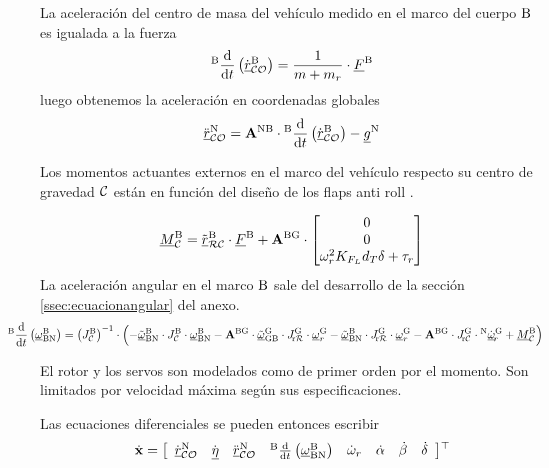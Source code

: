 La aceleración del centro de masa del vehículo medido en el marco del cuerpo $\mathrm{B}$ es igualada a la fuerza
\begin{equation}
	{}^{\mathrm{B}}\frac{\textrm{d} }{\textrm{d} t}\left( \dot{{ \underline{r} }}_{\mathcal{CO}}^{\mathrm{B}} \right) = \frac{1}{m+m_r} \cdot { \underline{F} }^{\mathrm{B}}
\end{equation}
luego obtenemos la aceleración en coordenadas globales
\begin{equation}
	\ddot{{ \underline{r} }}_{\mathcal{CO}}^{\mathrm{N}} =
	\mathbf{A}^{\mathrm{NB}}\cdot {}^{\mathrm{B}}\frac{\textrm{d} }{\textrm{d} t}\left( \dot{{ \underline{r} }}_{\mathcal{CO}}^{\mathrm{B}} \right)- { \underline{g} }^{\mathrm{N}}
\end{equation}

Los momentos actuantes externos en el marco del vehículo respecto su centro de gravedad $\mathcal{C}$ están en función del diseño de los flaps anti roll \cite{romarowski2020edf}.

\begin{equation}
	{ \underline{M} }^{\mathrm{B}}_{\mathcal{C}} = \tilde{{ \underline{r} }}_{\mathcal{RC}}^{\mathrm{B}}\cdot { \underline{F} }^{\mathrm{B}} + \mathbf{A}^{\mathrm{BG}} \cdot 
	\begin{bmatrix}
		0 \\
		0 \\
		\omega_r^2 K_{F_L}d_T\delta+\tau_r
	\end{bmatrix}  
\end{equation}
%
La aceleración angular en el marco $\mathrm{B}$ sale del desarrollo de la sección \ref{ssec:ecuacionangular} del anexo.
\begin{equation}
	\hspace{-1cm}
{}^\frm{B}\frac{\di }{\di t} \left(\avec{\omega}_\frm{BN}^\frm{B} \right) =  \left(\inertia{C}{B}\right)^{-1} \cdot \left( - \skw{\avec{\omega}}_\frm{BN}^\frm{B} \cdot \inertia{C}{B}\cdot \avec{\omega}_{\frm{BN}}^{\frm{B}} - 
\transform{{BG}} \cdot\skw{\avec{\omega}}_\frm{GB}^\frm{G} \cdot \inertiarotor{R}{G}  \cdot \avec{\omega}_r^\frm{G} -
\skw{\avec{\omega}}_\frm{BN}^\frm{B} \cdot \inertiarotor{R}{G}  \cdot \avec{\omega}_r^\frm{G} -
\transform{{BG}}\cdot  \inertiarotor{C}{G} \cdot  {}^\frm{N} \dot{\avec{\omega}}_{\!r}^{\frm{G}} + \avec{M}_\ogn{C}^\frm{B} \right)
\end{equation}

El rotor y los servos son modelados como de primer orden por el momento. Son limitados por velocidad máxima según sus especificaciones.

Las ecuaciones diferenciales se pueden entonces escribir
\begin{equation} \label{eq:ssDiffVariables3D}
	\dot{\mathbf{x}} = \left[
	\begin{array}{cccccccc}
		\dot{{ \underline{r} }}_{\mathcal{CO}}^{\mathrm{N}}& \dot{{ \underline{\eta} }} &\ddot{{ \underline{r} }}_{\mathcal{CO}}^{\mathrm{N}} & {}^{\mathrm{B}}\frac{\textrm{d} }{\textrm{d} t} \left({ \underline{\omega} }_{\mathrm{BN}}^{\mathrm{B}} \right) & \dot{\omega}_r & \dot{\alpha} & \dot{\beta} & \dot{\delta}
	\end{array}\right] \!^{\top}\!
\end{equation}


